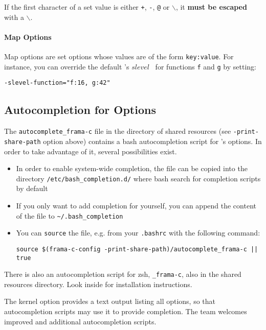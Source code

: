 \begin{important}
If the first character of a set value is either \texttt{+}, \texttt{-},
\texttt{@} or $\backslash$, it \textbf{must be escaped} with a $\backslash$.
\end{important}

\paragraph{Map Options}

Map options are set options whose values are of the form \texttt{key:value}. For
instance, you can override the default \Value's $slevel$~\cite{value} for
functions \texttt{f} and \texttt{g} by setting:
\begin{commands}
\texttt{-slevel-function="f:16, g:42"}
\end{commands}

\subsection{Autocompletion for Options}

The \texttt{autocomplete\_frama-c} file in the directory of shared resources
(see \texttt{-print-share-path} option above) contains a
bash autocompletion script for \FramaC's options. In order to take advantage
of it, several possibilities exist.
\begin{itemize}
\item In order to enable system-wide completion, the file can be copied
  into the directory \texttt{/etc/bash\_completion.d/} where bash search for
  completion scripts by default
\item If you only want to add completion for yourself, you can append the
content of the file to \texttt{\~{}/.bash\_completion}
\item You can \texttt{source} the file, e.g. from your \texttt{.bashrc} with
the following command:
\begin{verbatim}
source $(frama-c-config -print-share-path)/autocomplete_frama-c || true
\end{verbatim}
\end{itemize}

There is also an autocompletion script for zsh, \texttt{\_frama-c}, also
in the shared resources directory. Look inside for installation instructions.

The kernel option  provides a text output listing
all \FramaC options, so that autocompletion scripts may use it to provide
completion. The \FramaC team welcomes improved and additional autocompletion
scripts.

